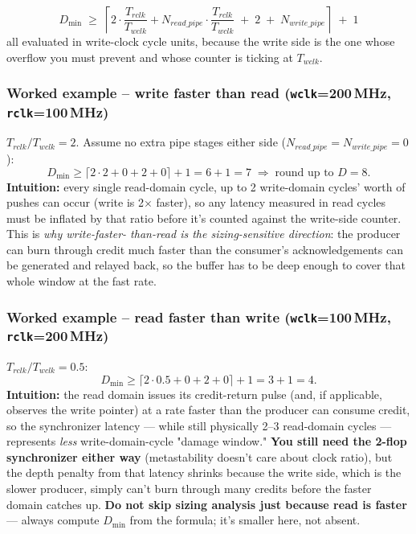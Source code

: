 \documentclass[12pt]{article}
\begin{document}
\begin{formulabox}
\[
D_{\min} \;\geq\; \left\lceil 2\cdot\frac{T_{rclk}}{T_{wclk}} + N_{read\_pipe}\cdot\frac{T_{rclk}}{T_{wclk}}
\;+\; 2 \;+\; N_{write\_pipe} \right\rceil \;+\; 1
\]
all evaluated in write-clock cycle units, because the write side is the one
whose overflow you must prevent and whose counter is ticking at
$T_{wclk}$.
\end{formulabox}

\subsubsection{Worked example -- write faster than read (\texttt{wclk}=200\,MHz, \texttt{rclk}=100\,MHz)}
$T_{rclk}/T_{wclk} = 2$. Assume no extra pipe stages either side
($N_{read\_pipe}=N_{write\_pipe}=0$):
\[
D_{\min} \geq \lceil 2\cdot2 + 0 + 2 + 0\rceil + 1 = 6+1 = 7 \;\Rightarrow\; \text{round up to } D=8.
\]
\textbf{Intuition:} every single read-domain cycle, up to 2 write-domain
cycles' worth of pushes can occur (write is 2$\times$ faster), so any
latency measured in read cycles must be inflated by that ratio before it's
counted against the write-side counter. This is \emph{why write-faster-
than-read is the sizing-sensitive direction}: the producer can burn through
credit much faster than the consumer's acknowledgements can be generated
and relayed back, so the buffer has to be deep enough to cover that whole
window at the fast rate.

\subsubsection{Worked example -- read faster than write (\texttt{wclk}=100\,MHz, \texttt{rclk}=200\,MHz)}
$T_{rclk}/T_{wclk} = 0.5$:
\[
D_{\min} \geq \lceil 2\cdot0.5 + 0 + 2 + 0\rceil + 1 = 3+1 = 4.
\]
\textbf{Intuition:} the read domain issues its credit-return pulse (and, if
applicable, observes the write pointer) at a rate faster than the producer
can consume credit, so the synchronizer latency — while still physically
2--3 read-domain cycles — represents \emph{less} write-domain-cycle
"damage window." \textbf{You still need the 2-flop synchronizer either
way} (metastability doesn't care about clock ratio), but the depth penalty
from that latency shrinks because the write side, which is the slower
producer, simply can't burn through many credits before the faster domain
catches up. \textbf{Do not skip sizing analysis just because read is
faster} — always compute $D_{\min}$ from the formula; it's smaller here,
not absent.
\end{document}
